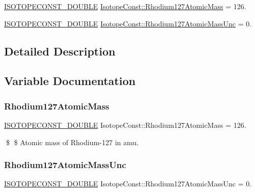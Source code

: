 \begin{DoxyCompactItemize}
\item 
\mbox{\hyperlink{group___isotope_const-_macros_ga8f45a7272ce02c0b4c65c44636ed719a}{I\+S\+O\+T\+O\+P\+E\+C\+O\+N\+S\+T\+\_\+\+D\+O\+U\+B\+LE}} \mbox{\hyperlink{group___isotope_const-_rhodium-_rh127_ga4c10952ba27cde88fab5d35ce3d66ea0}{Isotope\+Const\+::\+Rhodium127\+Atomic\+Mass}} = 126.
\item 
\mbox{\hyperlink{group___isotope_const-_macros_ga8f45a7272ce02c0b4c65c44636ed719a}{I\+S\+O\+T\+O\+P\+E\+C\+O\+N\+S\+T\+\_\+\+D\+O\+U\+B\+LE}} \mbox{\hyperlink{group___isotope_const-_rhodium-_rh127_ga5450bbf8d327ae42bbd5d21ed02ccc40}{Isotope\+Const\+::\+Rhodium127\+Atomic\+Mass\+Unc}} = 0.
\end{DoxyCompactItemize}


\subsection{Detailed Description}


\subsection{Variable Documentation}
\mbox{\label{group___isotope_const-_rhodium-_rh127_ga4c10952ba27cde88fab5d35ce3d66ea0}} 
\subsubsection{\texorpdfstring{Rhodium127\+Atomic\+Mass}{Rhodium127AtomicMass}}
{\footnotesize\ttfamily \mbox{\hyperlink{group___isotope_const-_macros_ga8f45a7272ce02c0b4c65c44636ed719a}{I\+S\+O\+T\+O\+P\+E\+C\+O\+N\+S\+T\+\_\+\+D\+O\+U\+B\+LE}} Isotope\+Const\+::\+Rhodium127\+Atomic\+Mass = 126.}

\$ \$ Atomic mass of Rhodium-\/127 in amu. \mbox{\label{group___isotope_const-_rhodium-_rh127_ga5450bbf8d327ae42bbd5d21ed02ccc40}} 
\subsubsection{\texorpdfstring{Rhodium127\+Atomic\+Mass\+Unc}{Rhodium127AtomicMassUnc}}
{\footnotesize\ttfamily \mbox{\hyperlink{group___isotope_const-_macros_ga8f45a7272ce02c0b4c65c44636ed719a}{I\+S\+O\+T\+O\+P\+E\+C\+O\+N\+S\+T\+\_\+\+D\+O\+U\+B\+LE}} Isotope\+Const\+::\+Rhodium127\+Atomic\+Mass\+Unc = 0.}

